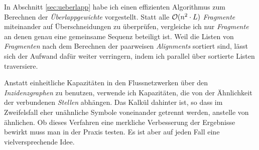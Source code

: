 In Abschnitt \ref{sec:ueberlapp} habe ich einen effizienten Algorithmus zum Berechnen der \emph{Überlappgewichte} vorgestellt. Statt alle $\mathcal{O}(n^2\cdot L)$ \emph{Fragmente} miteinander auf Überschneidungen zu überprüfen, vergleiche ich nur \emph{Fragmente} an denen genau eine gemeinsame Sequenz beteiligt ist. Weil die Listen von \emph{Fragmenten} nach dem Berechnen der paarweisen \emph{Alignments} sortiert sind, lässt sich der Aufwand dafür weiter verringern, indem ich parallel über sortierte Listen traversiere.

Anstatt einheitliche Kapazitäten in den Flussnetzwerken über den \emph{Inzidenzgraphen} zu benutzen, verwende ich Kapazitäten, die von der Ähnlichkeit der verbundenen \emph{Stellen} abhängen. Das Kalkül dahinter ist, so dass im Zweifelsfall eher unähnliche Symbole voneinander getrennt werden, anstelle von ähnlichen. Ob dieses Verfahren eine merkliche Verbesserung der Ergebnisse bewirkt muss man in der Praxis testen. Es ist aber auf jeden Fall eine vielversprechende Idee.













